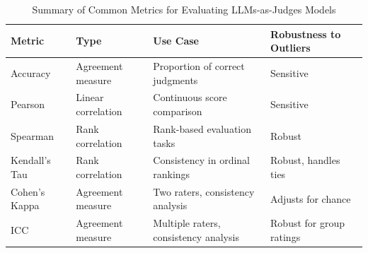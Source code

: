 \begin{table}[t]
    \centering
    \small
    \caption{Summary of Common Metrics for Evaluating LLMs-as-Judges Models}
    \begin{tabular}{l|l|l|l}
        \hline
        \textbf{Metric} & \textbf{Type} & \textbf{Use Case} & \textbf{Robustness to Outliers} \\
        \hline
        \hline
        Accuracy & Agreement measure & Proportion of correct judgments & Sensitive \\
        \hline
        Pearson & Linear correlation & Continuous score comparison & Sensitive \\
        \hline
        Spearman & Rank correlation & Rank-based evaluation tasks & Robust \\
        \hline
        Kendall's Tau & Rank correlation & Consistency in ordinal rankings & Robust, handles ties \\
        \hline
        Cohen's Kappa & Agreement measure & Two raters, consistency analysis & Adjusts for chance \\
        \hline
        ICC & Agreement measure & Multiple raters, consistency analysis & Robust for group ratings \\
        \hline
    \end{tabular}
    
\end{table}
